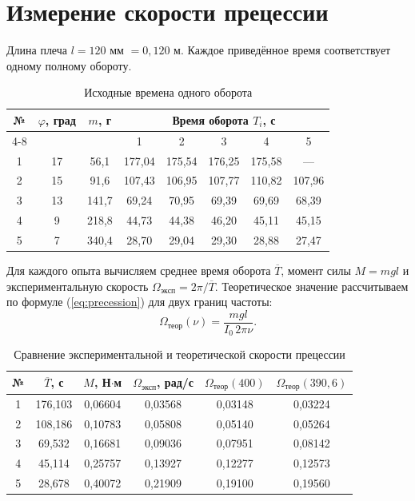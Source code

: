 \documentclass[12pt,a4paper]{article}
\begin{document}
\section{Измерение скорости прецессии}

Длина плеча $l=120$ мм $=0{,}120$ м. Каждое приведённое время соответствует одному полному обороту.
\begin{table}[H]
\centering
\caption{Исходные времена одного оборота}
\small
\begin{tabular}{c c c c c c c c}
\toprule
№ & $\varphi$, град & $m$, г & \multicolumn{5}{c}{Время оборота $T_i$, с}\\
\cmidrule(lr){4-8}
 & & & 1 & 2 & 3 & 4 & 5\\
\midrule
1 & 17 & 56,1 & 177,04 & 175,54 & 176,25 & 175,58 & ---\\
2 & 15 & 91,6 & 107,43 & 106,95 & 107,77 & 110,82 & 107,96\\
3 & 13 & 141,7 & 69,24 & 70,95 & 69,39 & 69,69 & 68,39\\
4 & 9 & 218,8 & 44,73 & 44,38 & 46,20 & 45,11 & 45,15\\
5 & 7 & 340,4 & 28,70 & 29,04 & 29,30 & 28,88 & 27,47\\
\bottomrule
\end{tabular}
\end{table}

Для каждого опыта вычисляем среднее время оборота $\overline T$, момент силы $M=mgl$ и экспериментальную скорость $\Omega_{\text{эксп}}=2\pi/\overline T$. Теоретическое значение рассчитываем по формуле (\ref{eq:precession}) для двух границ частоты:
\[
\Omega_{\text{теор}}(\nu)=\frac{mgl}{I_0\,2\pi \nu}.
\]

\begin{table}[H]
\centering
\caption{Сравнение экспериментальной и теоретической скорости прецессии}
\small
\begin{tabular}{c c c c c c}
\toprule
№ & $\overline T$, с & $M$, Н$\cdot$м & $\Omega_{\text{эксп}}$, рад/с &
$\Omega_{\text{теор}}(400)$ & $\Omega_{\text{теор}}(390{,}6)$\\
\midrule
1 & 176,103 & 0,06604 & 0,03568 & 0,03148 & 0,03224\\
2 & 108,186 & 0,10783 & 0,05808 & 0,05140 & 0,05264\\
3 & 69,532 & 0,16681 & 0,09036 & 0,07951 & 0,08142\\
4 & 45,114 & 0,25757 & 0,13927 & 0,12277 & 0,12573\\
5 & 28,678 & 0,40072 & 0,21909 & 0,19100 & 0,19560\\
\bottomrule
\end{tabular}
\end{table}
\end{document}
